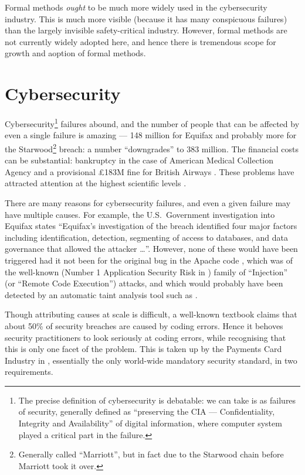 \documentclass{llncs}
\begin{document}
Formal methods \emph{ought} to be much more widely used in the cybersecurity industry.  This is much more visible (because it has many conspicuous failures) than the largely invisible safety-critical industry. However, formal methods are not currently widely adopted here, and hence there is tremendous scope for growth and aoption of formal methods.

\section{Cybersecurity}
Cybersecurity\footnote{The precise definition of cybersecurity is debatable: we can take is as failures of security, generally defined as ``preserving the CIA --- Confidentiality, Integrity and Availability'' of digital information, where computer system played a critical part in the failure.} failures abound, and the number of people that can be affected by even a single failure is amazing --- 148 million for Equifax \cite{Bloomberg2018b} and probably more for the Starwood\footnote{Generally called ``Marriott'', but in fact due to the Starwood chain before Marriott took it over.} breach: %
a number \cite{Irwin2019b} ``downgrades'' to 383 million.  The financial costs can be substantial: bankruptcy in the case of American Medical Collection Agency \cite{Ford2019b} and a provisional \pounds183M fine for British Airways \cite{Guardian2019i}.  These problems have attracted attention at the highest scientific levels \cite{RoyalSociety2016a}.
\par
There are many reasons for cybersecurity failures, and even a given failure may have multiple causes. For example, the U.S.~Government investigation \cite{GAO2018a} into Equifax states ``Equifax's investigation of the breach identified four major factors
including identification, detection, segmenting of access to databases, and data
governance that allowed the attacker \dots''.  However, none of these would have been triggered had it not been for the original bug in the Apache code \cite{Lenart2017a}, which was of the well-known (Number 1 Application Security Risk in \cite{OWASP2017a})  family of ``Injection'' (or ``Remote Code Execution'') attacks, and which would probably have been detected by an automatic taint analysis tool such as \cite{LivshitsLam2005}.
\par
Though attributing causes at scale is difficult, a well-known textbook \cite{McGraw2006} claims that about 50\% of security breaches are caused by coding errors. Hence it behoves security practitioners to look seriously at coding errors, while recognising that this is only one facet of the problem. This is taken up by the Payments Card Industry in \cite{PCI2018b}, essentially the only world-wide mandatory security standard, in two requirements.
\end{document}
